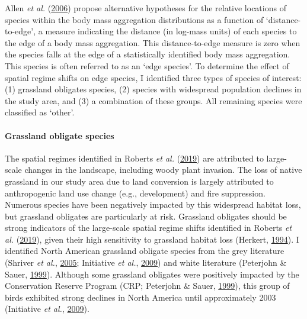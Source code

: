 \documentclass[print]{nuthesis}
\begin{document}
Allen \emph{et al.} (\protect\hyperlink{ref-allen2006patterns}{2006}) propose alternative hypotheses for the relative locations of species within the body mass aggregation distributions as a function of `distance-to-edge', a measure indicating the distance (in log-mass units) of each species to the edge of a body mass aggregation. This distance-to-edge measure is zero when the species falls at the edge of a statistically identified body mass aggregation. This species is often referred to as an `edge species'. To determine the effect of spatial regime shifts on edge species, I identified three types of species of interest: (1) grassland obligates species, (2) species with widespread population declines in the study area, and (3) a combination of these groups. All remaining species were classified as `other'.

\hypertarget{grassland-obligate-species}{%
\paragraph{Grassland obligate species}\label{grassland-obligate-species}}

The spatial regimes identified in Roberts \emph{et al.} (\protect\hyperlink{ref-roberts2019shifting}{2019}) are attributed to large-scale changes in the landscape, including woody plant invasion. The loss of native grassland in our study area due to land conversion is largely attributed to anthropogenic land use change (e.g., development) and fire suppression. Numerous species have been negatively impacted by this widespread habitat loss, but grassland obligates are particularly at risk. Grassland obligates should be strong indicators of the large-scale spatial regime shifts identified in Roberts \emph{et al.} (\protect\hyperlink{ref-roberts2019shifting}{2019}), given their high sensitivity to grassland habitat loss (Herkert, \protect\hyperlink{ref-herkert1994effects}{1994}). I identified North American grassland obligate species from the grey literature (Shriver \emph{et al.}, \protect\hyperlink{ref-shriver2005distribution}{2005}; Initiative \emph{et al.}, \protect\hyperlink{ref-north2009state}{2009}) and white literature (Peterjohn \& Sauer, \protect\hyperlink{ref-peterjohn1999population}{1999}). Although some grassland obligates were positively impacted by the Conservation Reserve Program (CRP; Peterjohn \& Sauer, \protect\hyperlink{ref-peterjohn1999population}{1999}), this group of birds exhibited strong declines in North America until approximately 2003 (Initiative \emph{et al.}, \protect\hyperlink{ref-north2009state}{2009}).
\end{document}
